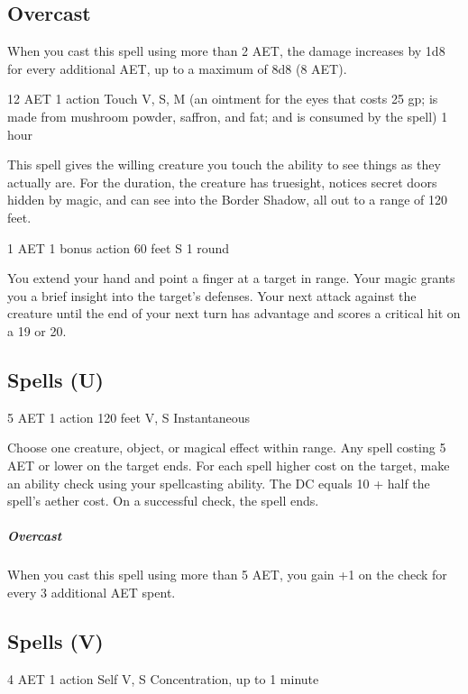 \subsection*{Overcast} When you cast this spell using more than 2 AET, the damage increases by 1d8 for every additional AET, up to a maximum of 8d8 (8 AET).


{12 AET}
{1 action}
{Touch}
{V, S, M (an ointment for the eyes that costs 25 gp; is made from mushroom powder, saffron, and fat; and is consumed by the spell)}
{1 hour}

This spell gives the willing creature you touch the ability to see things as they actually are. For the duration, the creature has truesight, notices secret doors hidden by magic, and can see into the Border Shadow, all out to a range of 120 feet.


{1 AET}
{1 bonus action}
{60 feet}
{S}
{1 round}

You extend your hand and point a finger at a target in range. Your magic grants you a brief insight into the target's defenses. Your next attack against the creature until the end of your next turn has advantage and scores a critical hit on a 19 or 20. 

\subsection{Spells (U)}

{5 AET}
{1 action}
{120 feet}
{V, S}
{Instantaneous}

Choose one creature, object, or magical effect within range. Any spell costing 5 AET or lower on the target ends. For each spell higher cost on the target, make an ability check using your spellcasting ability. The DC equals 10 + half the spell's aether cost. On a successful check, the spell ends.

\subparagraph*{Overcast} When you cast this spell using more than 5 AET, you gain +1 on the check for every 3 additional AET spent.

\subsection{Spells (V)}


{4 AET}
{1 action}
{Self}
{V, S}
{Concentration, up to 1 minute}

